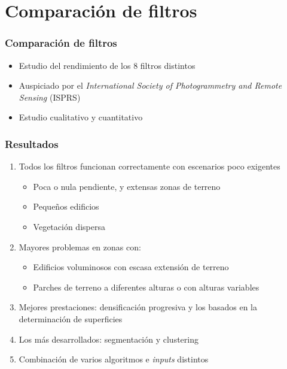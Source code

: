 \section{Comparación de filtros}
\begin{frame}
  \frametitle{Comparación de filtros}
    \begin{itemize}
      \item Estudio del rendimiento de los 8 filtros distintos 
      \item Auspiciado por el \emph{International Society of Photogrammetry and
        Remote Sensing} (\alert{ISPRS})
      \item Estudio cualitativo y cuantitativo
    \end{itemize}
\end{frame}
\begin{frame}
  \frametitle{Resultados}
  \begin{enumerate}
    \item Todos los filtros funcionan correctamente con escenarios poco exigentes
      \begin{itemize}
        \item Poca o nula pendiente, y extensas zonas de terreno
        \item Pequeños edificios
        \item Vegetación dispersa
      \end{itemize}
    \item Mayores problemas en zonas con:
      \begin{itemize}
        \item Edificios voluminosos con escasa extensión de terreno
        \item Parches de terreno a diferentes alturas o con alturas variables
      \end{itemize}
    \item Mejores prestaciones: \alert{densificación progresiva} y los basados
      en la \alert{determinación de superficies}
    \item Los más desarrollados: \alert{segmentación y clustering}
    \item \alert{Combinación} de varios algoritmos e \emph{inputs} distintos
  \end{enumerate}
\end{frame}
